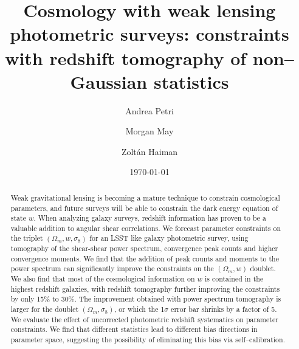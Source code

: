\documentclass[reprint,aps,prd,superscriptaddress,showkeys,showpacs]{revtex4-1}
\begin{document}
\title{Cosmology with weak lensing photometric surveys: constraints with redshift tomography of non--Gaussian statistics}

\author{Andrea Petri}

\author{Morgan May}

\author{Zolt\'an Haiman}

\date{\today}

\label{firstpage}

\begin{abstract}
Weak gravitational lensing is becoming a mature technique to constrain cosmological parameters, and future surveys will be able to constrain the dark energy equation of state $w$. When analyzing galaxy surveys, redshift information has proven to be a valuable addition to angular shear correlations. We forecast parameter constraints on the triplet $(\Omega_m,w,\sigma_8)$ for an LSST like galaxy photometric survey, using tomography of the shear-shear power spectrum, convergence peak counts and higher convergence moments. We find that the addition of peak counts and moments to the power spectrum can significantly improve the constraints on the $(\Omega_m,w)$ doublet. We also find that most of the cosmological information on $w$ is contained in the highest redshift galaxies, with redshift tomography further improving the constraints by only 15\% to 30\%. The improvement obtained with power spectrum tomography is larger for the doublet $(\Omega_m,\sigma_8)$, or which the 1$\sigma$ error bar shrinks by a factor of 5. We evaluate the effect of uncorrected photometric redshift systematics on parameter constraints. We find that different statistics lead to different bias directions in parameter space, suggesting the possibility of eliminating this bias via self--calibration. 
\end{abstract}



\maketitle
\end{document}

